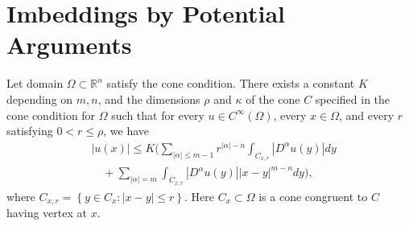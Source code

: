 \section{Imbeddings by Potential Arguments}


\begin{lemma}
  Let domain $\Omega \subset \mathbb{R}^n$ satisfy the cone condition. There exists a constant $K$ 
  depending on $m, n$, and the dimensions $\rho$ and $\kappa$ of the cone $C$ specified in the 
  cone condition for $\Omega$ such that for every $u \in C^{\infty}(\Omega)$,
  every $x \in \Omega$, and every $r$ satisfying $0<r \leq \rho$, we have
  \begin{equation}
    \begin{aligned}
      & |u(x)| \leq K\Biggl(\sum_{|\alpha| \leq m-1} r^{|\alpha|-n} \int_{C_{x, r}}\left|D^\alpha u(y)\right| d y \\
      & \quad+\sum_{|\alpha|=m} \int_{C_{x, r}}\left|D^\alpha u(y)\right||x-y|^{m-n} d y\Biggr),
    \end{aligned}
  \end{equation}
  where $C_{x, r}=\left\{y \in C_x:|x-y| \leq r\right\}$. Here $C_x \subset \Omega$ is a cone 
  congruent to $C$ having vertex at $x$.
\end{lemma}

